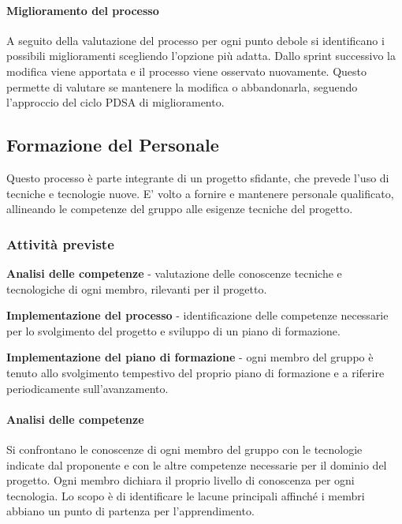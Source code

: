 \documentclass[12pt, a4paper]{article}
\begin{document}
\paragraph{Miglioramento del processo}

A seguito della valutazione del processo per ogni punto debole si
identificano i possibili miglioramenti scegliendo l'opzione più adatta.
Dallo sprint successivo la modifica viene apportata e il processo viene
osservato nuovamente. Questo permette di valutare se mantenere la
modifica o abbandonarla, seguendo l'approccio del ciclo PDSA di
miglioramento.

\subsection{Formazione del Personale}

Questo processo è parte integrante di un progetto sfidante, che prevede
l'uso di tecniche e tecnologie nuove. E' volto a fornire e mantenere
personale qualificato, allineando le competenze del gruppo alle esigenze
tecniche del progetto.

\subsubsection{Attività previste}

\textbf{Analisi delle competenze} - valutazione delle conoscenze
tecniche e tecnologiche di ogni membro, rilevanti per il progetto.

\textbf{Implementazione del processo} - identificazione delle competenze
necessarie per lo svolgimento del progetto e sviluppo di un piano di
formazione.

\textbf{Implementazione del piano di formazione} - ogni membro del
gruppo è tenuto allo svolgimento tempestivo del proprio piano di
formazione e a riferire periodicamente sull'avanzamento.

\paragraph{Analisi delle competenze}

Si confrontano le conoscenze di ogni membro del gruppo con le tecnologie
indicate dal proponente e con le altre competenze necessarie per il
dominio del progetto. Ogni membro dichiara il proprio livello di
conoscenza per ogni tecnologia. Lo scopo è di identificare le lacune
principali affinché i membri abbiano un punto di partenza per
l'apprendimento.
\end{document}
